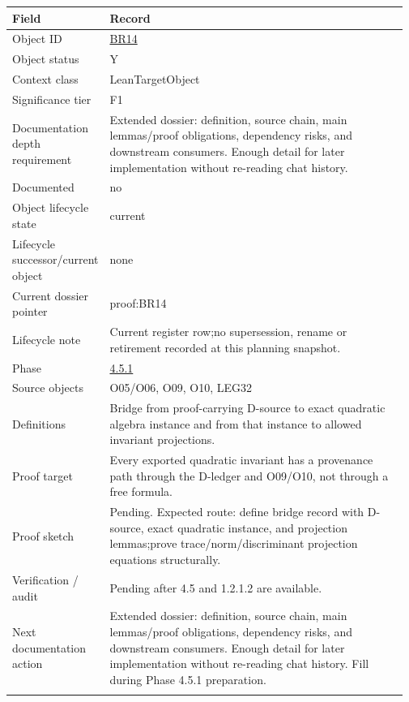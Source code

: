 \begin{longtable}{L{0.16\linewidth} L{0.81\linewidth}}
\hline
\textbf{Field} & \textbf{Record}\\
\hline
Object ID & \hyperlink{object-row-BR14}{BR14}\\
\hline\addlinespace[0.20em]
Object status & Y\\
\hline\addlinespace[0.20em]
Context class & LeanTargetObject\\
\hline\addlinespace[0.20em]
Significance tier & F1\\
\hline\addlinespace[0.20em]
Documentation depth requirement & Extended dossier: definition, source chain, main lemmas/\allowbreak{}proof obligations, dependency risks, and downstream consumers. Enough detail for later implementation without re-reading chat history.\\
\hline\addlinespace[0.20em]
Documented & no\\
\hline\addlinespace[0.20em]
Object lifecycle state & current\\
\hline\addlinespace[0.20em]
Lifecycle successor/\allowbreak{}current object & none\\
\hline\addlinespace[0.20em]
Current dossier pointer & proof:BR14\\
\hline\addlinespace[0.20em]
Lifecycle note & Current register row;\newline no supersession, rename or retirement recorded at this planning snapshot.\\
\hline\addlinespace[0.20em]
Phase & \hyperlink{phase-row-4-5-1}{4.5.1}\\
\hline\addlinespace[0.20em]
Source objects & O05/\allowbreak{}O06, O09, O10, LEG32\\
\hline\addlinespace[0.20em]
Definitions & Bridge from proof-carrying D-source to exact quadratic algebra instance and from that instance to allowed invariant projections.\\
\hline\addlinespace[0.20em]
Proof target & Every exported quadratic invariant has a provenance path through the D-ledger and O09/\allowbreak{}O10, not through a free formula.\\
\hline\addlinespace[0.20em]
Proof sketch & Pending. Expected route: define bridge record with D-source, exact quadratic instance, and projection lemmas;\newline prove trace/\allowbreak{}norm/\allowbreak{}discriminant projection equations structurally.\\
\hline\addlinespace[0.20em]
Verification /\allowbreak{} audit & Pending after 4.5 and 1.2.1.2 are available.\\
\hline\addlinespace[0.20em]
Next documentation action & Extended dossier: definition, source chain, main lemmas/\allowbreak{}proof obligations, dependency risks, and downstream consumers. Enough detail for later implementation without re-reading chat history. Fill during Phase 4.5.1 preparation.\\
\hline\addlinespace[0.20em]
\end{longtable}
